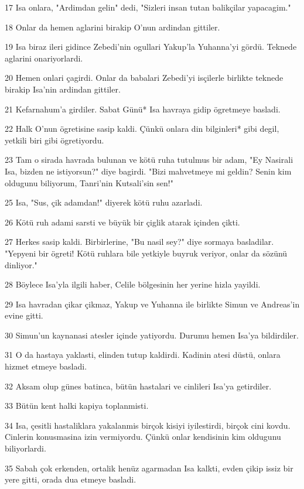 \par 17 Isa onlara, "Ardimdan gelin" dedi, "Sizleri insan tutan balikçilar yapacagim."
\par 18 Onlar da hemen aglarini birakip O'nun ardindan gittiler.
\par 19 Isa biraz ileri gidince Zebedi'nin ogullari Yakup'la Yuhanna'yi gördü. Teknede aglarini onariyorlardi.
\par 20 Hemen onlari çagirdi. Onlar da babalari Zebedi'yi isçilerle birlikte teknede birakip Isa'nin ardindan gittiler.
\par 21 Kefarnahum'a girdiler. Sabat Günü* Isa havraya gidip ögretmeye basladi.
\par 22 Halk O'nun ögretisine sasip kaldi. Çünkü onlara din bilginleri* gibi degil, yetkili biri gibi ögretiyordu.
\par 23 Tam o sirada havrada bulunan ve kötü ruha tutulmus bir adam, "Ey Nasirali Isa, bizden ne istiyorsun?" diye bagirdi. "Bizi mahvetmeye mi geldin? Senin kim oldugunu biliyorum, Tanri'nin Kutsali'sin sen!"
\par 25 Isa, "Sus, çik adamdan!" diyerek kötü ruhu azarladi.
\par 26 Kötü ruh adami sarsti ve büyük bir çiglik atarak içinden çikti.
\par 27 Herkes sasip kaldi. Birbirlerine, "Bu nasil sey?" diye sormaya basladilar. "Yepyeni bir ögreti! Kötü ruhlara bile yetkiyle buyruk veriyor, onlar da sözünü dinliyor."
\par 28 Böylece Isa'yla ilgili haber, Celile bölgesinin her yerine hizla yayildi.
\par 29 Isa havradan çikar çikmaz, Yakup ve Yuhanna ile birlikte Simun ve Andreas'in evine gitti.
\par 30 Simun'un kaynanasi atesler içinde yatiyordu. Durumu hemen Isa'ya bildirdiler.
\par 31 O da hastaya yaklasti, elinden tutup kaldirdi. Kadinin atesi düstü, onlara hizmet etmeye basladi.
\par 32 Aksam olup günes batinca, bütün hastalari ve cinlileri Isa'ya getirdiler.
\par 33 Bütün kent halki kapiya toplanmisti.
\par 34 Isa, çesitli hastaliklara yakalanmis birçok kisiyi iyilestirdi, birçok cini kovdu. Cinlerin konusmasina izin vermiyordu. Çünkü onlar kendisinin kim oldugunu biliyorlardi.
\par 35 Sabah çok erkenden, ortalik henüz agarmadan Isa kalkti, evden çikip issiz bir yere gitti, orada dua etmeye basladi.
